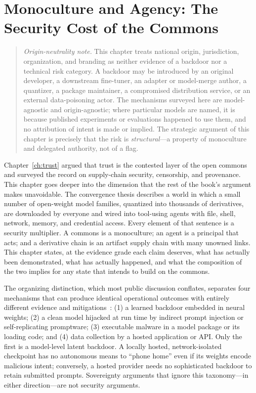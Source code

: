 \chapter{Monoculture and Agency: The Security Cost of the Commons}
\label{ch:order66}

\begin{quote}
\small\emph{Origin-neutrality note.} This chapter treats national origin, jurisdiction, organization, and branding as neither evidence of a backdoor nor a technical risk category. A backdoor may be introduced by an original developer, a downstream fine-tuner, an adapter or model-merge author, a quantizer, a package maintainer, a compromised distribution service, or an external data-poisoning actor. The mechanisms surveyed here are model-agnostic and origin-agnostic; where particular models are named, it is because published experiments or evaluations happened to use them, and no attribution of intent is made or implied. The strategic argument of this chapter is precisely that the risk is \emph{structural}---a property of monoculture and delegated authority, not of a flag.
\end{quote}

Chapter~\ref{ch:trust} argued that trust is the contested layer of the open commons and surveyed the record on supply-chain security, censorship, and provenance. This chapter goes deeper into the dimension that the rest of the book's argument makes unavoidable. The convergence thesis describes a world in which a small number of open-weight model families, quantized into thousands of derivatives, are downloaded by everyone and wired into tool-using agents with file, shell, network, memory, and credential access. Every element of that sentence is a security multiplier. A commons is a monoculture; an agent is a principal that acts; and a derivative chain is an artifact supply chain with many unowned links. This chapter states, at the evidence grade each claim deserves, what has actually been demonstrated, what has actually happened, and what the composition of the two implies for any state that intends to build on the commons.

The organizing distinction, which most public discussion conflates, separates four mechanisms that can produce identical operational outcomes with entirely different evidence and mitigations~\cite{order66}: (1) a learned backdoor embedded in neural weights; (2) a clean model hijacked at run time by indirect prompt injection or self-replicating promptware; (3) executable malware in a model package or its loading code; and (4) data collection by a hosted application or API. Only the first is a model-level latent backdoor. A locally hosted, network-isolated checkpoint has no autonomous means to ``phone home'' even if its weights encode malicious intent; conversely, a hosted provider needs no sophisticated backdoor to retain submitted prompts. Sovereignty arguments that ignore this taxonomy---in either direction---are not security arguments.

